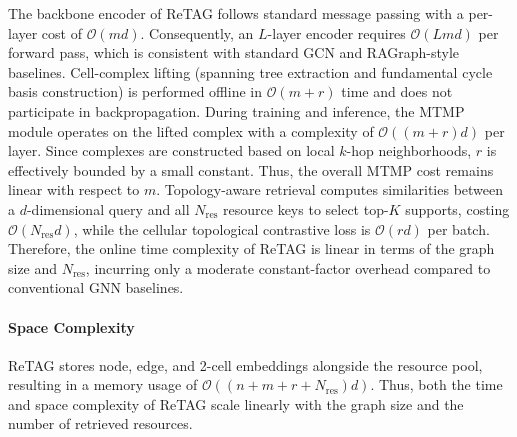 The backbone encoder of ReTAG follows standard message passing with a
per-layer cost of $\mathcal{O}(m d)$. Consequently, an $L$-layer
encoder requires $\mathcal{O}(L m d)$ per forward pass, which is
consistent with standard GCN and RAGraph-style baselines.
Cell-complex lifting (spanning tree extraction and fundamental cycle
basis construction) is performed offline in $\mathcal{O}(m + r)$ time
and does not participate in backpropagation.
During training and inference, the MTMP module operates on the lifted
complex with a complexity of $\mathcal{O}((m + r) d)$ per layer.
Since complexes are constructed based on local $k$-hop neighborhoods,
$r$ is effectively bounded by a small constant. Thus, the overall MTMP
cost remains linear with respect to $m$.
Topology-aware retrieval computes similarities between a $d$-dimensional
query and all $N_{\text{res}}$ resource keys to select top-$K$
supports, costing $\mathcal{O}(N_{\text{res}} d)$, while the cellular
topological contrastive loss is $\mathcal{O}(r d)$ per batch.
Therefore, the online time complexity of ReTAG is linear in terms of
the graph size and $N_{\text{res}}$, incurring only a moderate
constant-factor overhead compared to conventional GNN baselines.

\paragraph{Space Complexity}
ReTAG stores node, edge, and 2-cell embeddings alongside the resource
pool, resulting in a memory usage of
$\mathcal{O}((n + m + r + N_{\text{res}}) d)$.
Thus, both the time and space complexity of ReTAG scale linearly with
the graph size and the number of retrieved resources.
